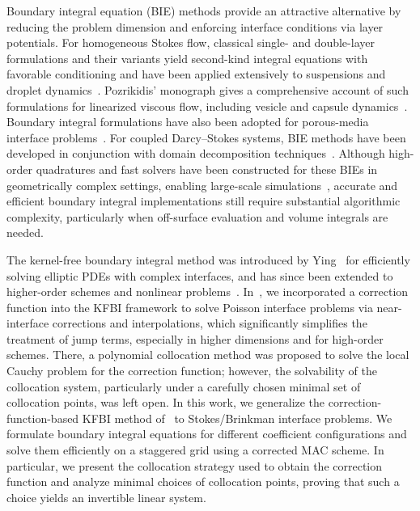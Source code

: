 \documentclass[preprint,11pt]{elsarticle}
\theoremstyle{remark}
\begin{document}
Boundary integral equation (BIE) methods provide an attractive alternative by reducing the problem dimension and enforcing interface conditions via layer potentials. 
For homogeneous Stokes flow, classical single- and double-layer formulations and their variants yield second-kind integral equations with favorable conditioning and have been applied extensively to suspensions and droplet dynamics~\cite{PowerMiranda1987CDL,GreengardKropinski2004StokesPeriodic}. 
Pozrikidis’ monograph gives a comprehensive account of such formulations for linearized viscous flow, including vesicle and capsule dynamics~\cite{Pozrikidis1992BIE}. 
Boundary integral formulations have also been adopted for porous-media interface problems~\cite{ahmadi_cortez_fujioka_2017}. 
For coupled Darcy–Stokes systems, BIE methods have been developed in conjunction with domain decomposition techniques~\cite{TLUPOVA2009158,Boubendir2013,TLUPOVA2022110824}. 
Although high-order quadratures and fast solvers have been constructed for these BIEs in geometrically complex settings, enabling large-scale simulations~\cite{HouLowengrubShelley2001BIM,GreengardKropinski2004StokesPeriodic,YingBirosZorin2006BIE3D,AMBROSE2013168}, accurate and efficient boundary integral implementations still require substantial algorithmic complexity, particularly when off-surface evaluation and volume integrals are needed.

The kernel-free boundary integral method was introduced by Ying~\cite{Ying2007} for efficiently solving elliptic PDEs with complex interfaces, and has since been extended to higher-order schemes and nonlinear problems~\cite{xie2020fourth,zhou2023kernel}. 
In~\cite{ZhouYing2024Correction}, we incorporated a correction function into the KFBI framework to solve Poisson interface problems via near-interface corrections and interpolations, which significantly simplifies the treatment of jump terms, especially in higher dimensions and for high-order schemes. 
There, a polynomial collocation method was proposed to solve the local Cauchy problem for the correction function; however, the solvability of the collocation system, particularly under a carefully chosen minimal set of collocation points, was left open. 
In this work, we generalize the correction-function-based KFBI method of~\cite{ZhouYing2024Correction} to Stokes/Brinkman interface problems. 
We formulate boundary integral equations for different coefficient configurations and solve them efficiently on a staggered grid using a corrected MAC scheme. 
In particular, we present the collocation strategy used to obtain the correction function and analyze minimal choices of collocation points, proving that such a choice yields an invertible linear system. 
\end{document}
